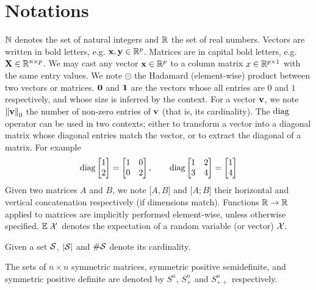\cleardoublepage
\chapter*{Notations}

$\mathbb{N}$ denotes the set of natural integers and $\mathbb{R}$ the set of real numbers.
%
Vectors are written in bold letters, e.g. $\mathbf{x}, \mathbf{y} \in \mathbb{R}^p$.
%
Matrices are in capital bold letters, e.g. $\mathbf{X} \in \mathbb{R}^{n \times p}$.
%
We may cast any vector $\mathbf{x} \in \mathbb{R}^p$ to a column matrix $x \in \mathbb{R}^{p \times 1}$ with the same entry values.
%
We note $\odot$ the Hadamard (element-wise) product between two vectors or matrices.
%
$\mathbf{0}$ and $\mathbf{1}$ are the vectors whose all entries are $0$ and $1$ respectively, and whose size is inferred by the context.
%
For a vector $\mathbf{v}$, we note $\left\lVert\mathbf{v}\right\rVert_0$ the number of non-zero entries of $\mathbf{v}$ (that is, its cardinality).
%
The $\operatorname*{diag}$ operator can be used in two contexts;
either to transform a vector into a diagonal matrix whose diagonal entries match the vector,
or to extract the diagonal of a matrix.
For example
\begin{equation*}
    \operatorname*{diag} \begin{bmatrix}
         1\\
         2
    \end{bmatrix}
    =
    \begin{bmatrix}
        1 & 0\\
        0 & 2
    \end{bmatrix}
    ,\qquad
    \operatorname*{diag} \begin{bmatrix}
        1 & 2\\
        3 & 4
    \end{bmatrix}
    =
    \begin{bmatrix}
         1\\
         4
    \end{bmatrix}
\end{equation*}
%
Given two matrices $A$ and $B$, we note $\big[ A, B \big]$ and $\big[ A; B \big]$ their horizontal and
vertical concatenation respectively (if dimensions match).
%
Functions $\mathbb{R} \to \mathbb{R}$ applied to matrices are implicitly performed element-wise, unless otherwise specified.
%
${\mathbb E}\left.\mathcal{X}\right.$ denotes the expectation of a random variable (or vector) $\mathcal{X}$.

Given a set $\mathcal{S}$, $\left\lvert\mathcal{S}\right\rvert$ and $\#\mathcal{S}$ denote its cardinality.

The sets of $n \times n$ symmetric matrices,
symmetric positive semidefinite,
and symmetric positive definite
are denoted by $S^n$, $S^n_+$ and $S^n_{++}$ respectively.
